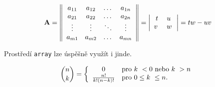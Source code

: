 \documentclass[a4paper, twocolumn, 11pt]{article}
\begin{document}
$$\mathbf{A} = \left \|
	\begin{array}{cccc}
		a_{11} & a_{12} & \dots  & a_{1n} \\
		a_{21} & a_{22} & \dots  & a_{2n} \\
		\vdots & \vdots & \ddots & \vdots \\
		a_{m1} & a_{m2} & \dots  & a_{mn}
	\end{array}
	\right \| = \left |
	\begin{array}{c l}
		t  & u~ \\
		v~ & w
	\end{array}
	\right| = tw - uv$$

Prostředí \verb|array| lze úspěšně využít i jinde.

$$ \binom{n}{k} = \left \{
	\begin{array}{c l}
		0                   & \text{pro } k~< 0 \text{ nebo } k~> n \\
		\frac{n!}{k!(n-k)!} & \text{pro } 0 \leq k~\leq n.
	\end{array}
	\right. $$
\end{document}
